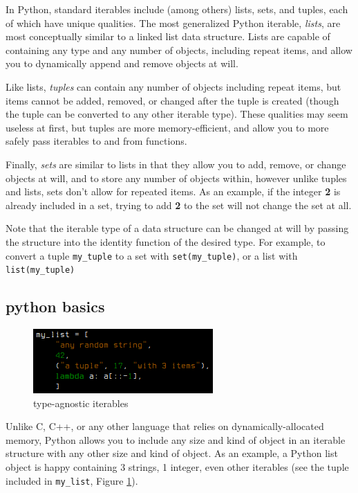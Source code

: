 \documentclass[12pt]{article}
\begin{document}
In Python, standard iterables include (among others) lists, sets, and tuples, each of which have unique qualities. The most generalized Python iterable, \textit{lists}, are most conceptually similar to a linked list data structure. Lists are capable of containing any type and any number of objects, including repeat items, and allow you to dynamically append and remove objects at will.

Like lists, \textit{tuples} can contain any number of objects including repeat items, but items cannot be added, removed, or changed after the tuple is created (though the tuple can be converted to any other iterable type). These qualities may seem useless at first, but tuples are more memory-efficient, and allow you to more safely pass iterables to and from functions.

Finally, \textit{sets} are similar to lists in that they allow you to add, remove, or change objects at will, and to store any number of objects within, however unlike tuples and lists, sets don't allow for repeated items. As an example, if the integer \textbf{2} is already included in a set, trying to add \textbf{2} to the set will not change the set at all.

Note that the iterable type of a data structure can be changed at will by passing the structure into the identity function of the desired type. For example, to convert a tuple \texttt{my\_tuple} to a set with \texttt{set(my\_tuple)}, or a list with \texttt{list(my\_tuple)}

\subsection{python basics}
\label{python basics}

\begin{figure}
	\begin{center}
		\includegraphics[width=.38\textwidth]{./figures/iterables.png}
		\caption{type-agnostic iterables}
		\label{iterables} %
	\end{center}
\end{figure}

Unlike \textsc{C}, \textsc{C++}, or any other language that relies on dynamically-allocated memory, Python allows you to include any size and kind of object in an iterable structure with any other size and kind of object. As an example, a Python list object is happy containing 3 strings, 1 integer, even other iterables (see the tuple included in \texttt{my\_list}, Figure \ref{iterables}).
\end{document}
